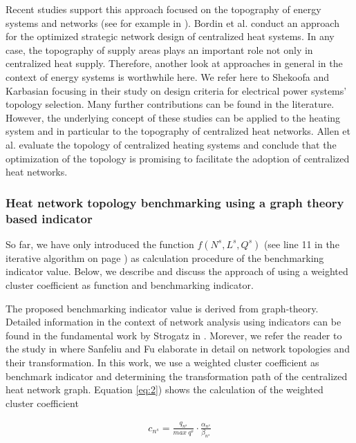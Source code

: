 Recent studies support this approach focused on the topography of energy systems and networks (see for example in \cite{abuelnasr2018examining}). Bordin et al. \cite{bordin2016optimization} conduct an approach for the optimized strategic network design of centralized heat systems. In any case, the topography of supply areas plays an important role not only in centralized heat supply. Therefore, another look at approaches in general in the context of energy systems is worthwhile here. We refer here to Shekoofa and Karbasian \cite{shekoofa2013design} focusing in their study on design criteria for electrical power systems' topology selection. Many further contributions can be found in the literature. However, the underlying concept of these studies can be applied to the heating system and in particular to the topography of centralized heat networks. Allen et al. \cite{allen2020evaluation} evaluate the topology of centralized heating systems and conclude that the optimization of the topology is promising to facilitate the adoption of centralized heat networks. 

\subsubsection{Heat network topology benchmarking using a graph theory based indicator}\label{bench}
So far, we have only introduced the function $f(N^{s}, L^{s}, Q^{s})$ (see line 11 in the iterative algorithm on page \pageref{Alg:2}) as calculation procedure of the benchmarking indicator value. Below, we describe and discuss the approach of using a weighted cluster coefficient as function and benchmarking indicator.\vspace{0.3cm}

The proposed benchmarking indicator value is derived from graph-theory. Detailed information in the context of network analysis using indicators can be found in the fundamental work by Strogatz in \cite{strogatz2001exploring}. Morever, we refer the reader to the study in \cite{sanfeliu1983distance} where Sanfeliu and Fu elaborate in detail on network topologies and their transformation. In this work, we use a weighted cluster coefficient as benchmark indicator and determining the transformation path of the centralized heat network graph. Equation \ref{eq:2}) shows the calculation of the weighted cluster coefficient

\begin{align}\label{eq:2}
c_{n^{s}}=\frac{q_{n^{s}}}{max~q^{s}}\cdot \frac{\alpha_{n^{s}}}{\beta_{n^{s}}}
\end{align}

